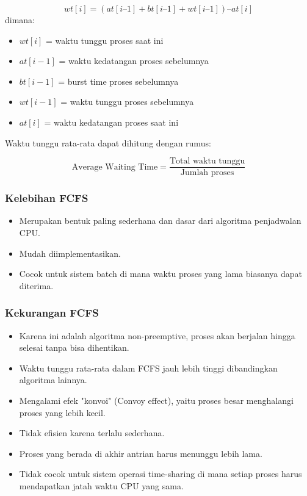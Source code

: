 \documentclass[12pt]{article}
\begin{document}
	\[
	wt[i] = (at[i–1] + bt[i–1] + wt[i–1]) – at[i]
	\]
	dimana:
	\begin{itemize}
		\item $wt[i]$ = waktu tunggu proses saat ini
		\item $at[i-1]$ = waktu kedatangan proses sebelumnya
		\item $bt[i-1]$ = burst time proses sebelumnya
		\item $wt[i-1]$ = waktu tunggu proses sebelumnya
		\item $at[i]$ = waktu kedatangan proses saat ini
	\end{itemize}
	
	Waktu tunggu rata-rata dapat dihitung dengan rumus:
	
	\[
	\text{Average Waiting Time} = \frac{\text{Total waktu tunggu}}{\text{Jumlah proses}}
	\]
	
	\subsubsection*{Kelebihan FCFS}
	\begin{itemize}
		\item Merupakan bentuk paling sederhana dan dasar dari algoritma penjadwalan CPU.
		\item Mudah diimplementasikan.
		\item Cocok untuk sistem batch di mana waktu proses yang lama biasanya dapat diterima.
	\end{itemize}
	
	\subsubsection*{Kekurangan FCFS}
	\begin{itemize}
		\item Karena ini adalah algoritma non-preemptive, proses akan berjalan hingga selesai tanpa bisa dihentikan.
		\item Waktu tunggu rata-rata dalam FCFS jauh lebih tinggi dibandingkan algoritma lainnya.
		\item Mengalami efek "konvoi" (Convoy effect), yaitu proses besar menghalangi proses yang lebih kecil.
		\item Tidak efisien karena terlalu sederhana.		
		\item Proses yang berada di akhir antrian harus menunggu lebih lama.		
		\item Tidak cocok untuk sistem operasi time-sharing di mana setiap proses harus mendapatkan jatah waktu CPU yang sama.	
	\end{itemize}
		
\end{document}
